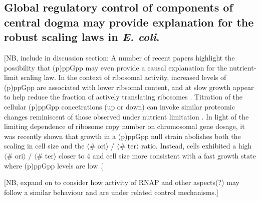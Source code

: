 \subsection{Global regulatory control of components of central dogma may
provide explanation for the robust scaling laws in \textit{E. coli}.}

[NB, include in
discussion section: A number of recent papers highlight the possibility that
(p)ppGpp may even provide a causal explanation for the nutrient-limit scaling
law. In the context of ribosomal activity, increased levels of (p)ppGpp are
associated with lower ribsomal content, and at slow growth appear to help reduce
the fraction of actively translating ribosomes \citep{dai2016, dai2018}.
Titration of the cellular (p)ppGpp concetrations (up or down) can invoke similar
proteomic changes reminiscent of those observed under nutrient limitation
\citep{zhu2019}. In light of the limiting dependence of ribosome copy number on
chromosomal gene dosage, it was recently shown that growth in a (p)ppGpp  null
strain abolishes both the scaling in cell size  and the $\langle$\# ori$\rangle$
/ $\langle$\# ter$\rangle$ ratio. Instead, cells exhibited a high $\langle$\#
ori$\rangle$ / $\langle$\# ter$\rangle$ closer to 4 and cell size more
consistent with a fast growth state where (p)ppGpp levels are low
\citep{fernandezcoll2020}.]

[NB, expand on to consider how activity of RNAP and other aspects(?) may follow a
similar behaviour and are under related control mechanisms.]
